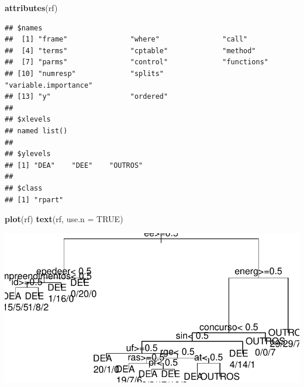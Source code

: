 \documentclass[]{article}
\newenvironment{Shaded}{\begin{snugshade}}{\end{snugshade}}
\newcommand{\KeywordTok}[1]{\textcolor[rgb]{0.13,0.29,0.53}{\textbf{#1}}}
\newcommand{\DataTypeTok}[1]{\textcolor[rgb]{0.13,0.29,0.53}{#1}}
\newcommand{\StringTok}[1]{\textcolor[rgb]{0.31,0.60,0.02}{#1}}
\newcommand{\CommentTok}[1]{\textcolor[rgb]{0.56,0.35,0.01}{\textit{#1}}}
\newcommand{\OtherTok}[1]{\textcolor[rgb]{0.56,0.35,0.01}{#1}}
\newcommand{\OperatorTok}[1]{\textcolor[rgb]{0.81,0.36,0.00}{\textbf{#1}}}
\newcommand{\NormalTok}[1]{#1}
\begin{document}
\begin{Shaded}
\begin{Highlighting}[]
\KeywordTok{attributes}\NormalTok{(rf)}
\end{Highlighting}
\end{Shaded}

\begin{verbatim}
## $names
##  [1] "frame"               "where"               "call"               
##  [4] "terms"               "cptable"             "method"             
##  [7] "parms"               "control"             "functions"          
## [10] "numresp"             "splits"              "variable.importance"
## [13] "y"                   "ordered"            
## 
## $xlevels
## named list()
## 
## $ylevels
## [1] "DEA"    "DEE"    "OUTROS"
## 
## $class
## [1] "rpart"
\end{verbatim}

\begin{Shaded}
\begin{Highlighting}[]
\KeywordTok{plot}\NormalTok{(rf)}
\KeywordTok{text}\NormalTok{(rf, }\DataTypeTok{use.n =} \OtherTok{TRUE}\NormalTok{)}
\end{Highlighting}
\end{Shaded}

\includegraphics{markdown_v41_test_files/figure-latex/unnamed-chunk-78-1.pdf}

\begin{Shaded}
\end{Shaded}
\end{document}
